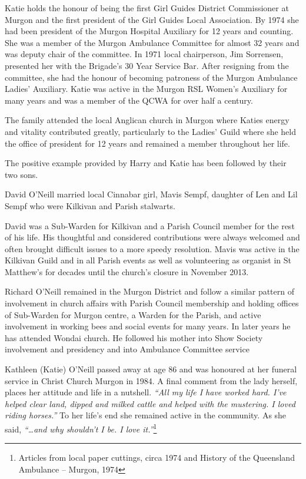 Katie holds the honour of being the first Girl Guides District Commissioner at Murgon and the first president of the Girl Guides Local Association. By 1974 she had been president of the Murgon Hospital Auxiliary for 12 years and counting. She was a member of the Murgon Ambulance Committee for almost 32 years and was deputy chair of the committee. In 1971 local chairperson, Jim Sorrensen, presented her with the Brigade's 30 Year Service Bar. After resigning from the committee, she had the honour of becoming patroness of the Murgon Ambulance Ladies' Auxiliary. Katie was active in the Murgon RSL Women's Auxiliary for many years and was a member of the QCWA for over half a century.

The family attended the local Anglican church in Murgon where Katies energy and vitality contributed greatly, particularly to the Ladies' Guild where she held the office of president for 12 years and remained a member throughout her life.

The positive example provided by Harry and Katie has been followed by their two sons.

David O'Neill married local Cinnabar girl, Mavis Sempf, daughter of Len and Lil Sempf who were Kilkivan and Parish stalwarts.

David was a Sub-Warden for Kilkivan and a Parish Council member for the rest of his life. His thoughtful and considered contributions were always welcomed and often brought difficult issues to a more speedy resolution. Mavis was active in the Kilkivan Guild and in all Parish events as well as volunteering as organist in St Matthew's for decades until the church's closure in November 2013.

Richard O'Neill remained in the Murgon District and follow a similar pattern of involvement in church affairs with Parish Council membership and holding offices of Sub-Warden for Murgon centre, a Warden for the Parish, and active involvement in working bees and social events for many years. In later years he has attended Wondai church. He followed his mother into Show Society involvement and presidency and into Ambulance Committee service

Kathleen (Katie) O'Neill passed away at age 86 and was honoured at her funeral service in Christ Church Murgon in 1984. A final comment from the lady herself, places her attitude and life in a nutshell. \emph{``All my life I have worked hard. I've helped clear land, dipped and milked cattle and helped with the mustering. I loved riding horses.''} To her life's end she remained active in the community. As she said, \emph{``\ldots and why shouldn't I be. I love it.''}\footnote{Articles from local paper cuttings, circa 1974 and History of the Queensland Ambulance -- Murgon, 1974}

